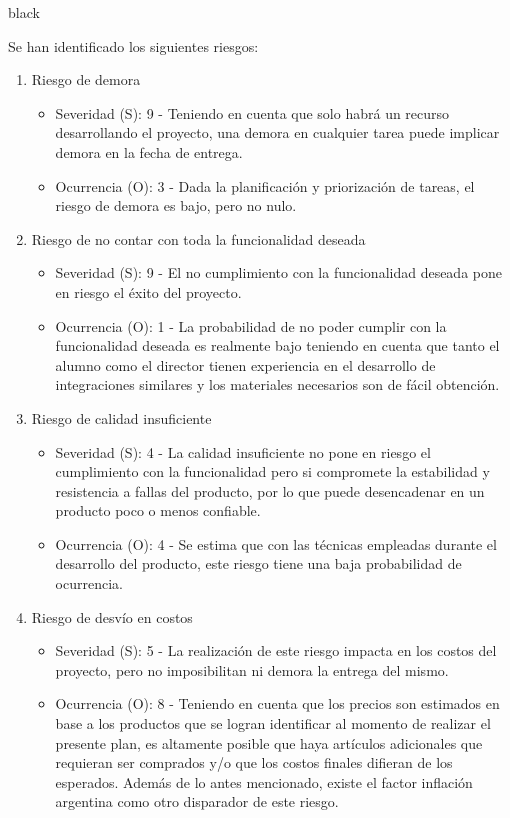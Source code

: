 \documentclass[
11pt, %
]{charter}
\begin{document}
\begin{consigna}{black}

Se han identificado los siguientes riesgos:


\begin{enumerate}

\item Riesgo de demora
\begin{itemize}
	\item Severidad (S): 9 - Teniendo en cuenta que solo habrá un recurso desarrollando el proyecto, una demora en cualquier tarea puede implicar demora en la fecha de entrega.
	\item Ocurrencia (O): 3 - Dada la planificación y priorización de tareas, el riesgo de demora es bajo, pero no nulo.
\end{itemize}


\item Riesgo de no contar con toda la funcionalidad deseada
\begin{itemize}
	\item Severidad (S): 9 - El no cumplimiento con la funcionalidad deseada pone en riesgo el éxito del proyecto.
	\item Ocurrencia (O): 1 - La probabilidad de no poder cumplir con la funcionalidad deseada es realmente bajo teniendo en cuenta que tanto el alumno como el director tienen experiencia en el desarrollo de integraciones similares y los materiales necesarios son de fácil obtención.
\end{itemize}

\item Riesgo de calidad insuficiente
\begin{itemize}
	\item Severidad (S): 4 - La calidad insuficiente no pone en riesgo el cumplimiento con la funcionalidad pero si compromete la estabilidad y resistencia a fallas del producto, por lo que puede desencadenar en un producto poco o menos confiable.
	\item Ocurrencia (O): 4 - Se estima que con las técnicas empleadas durante el desarrollo del producto, este riesgo tiene una baja probabilidad de ocurrencia.
\end{itemize}


\item Riesgo de desvío en costos
\begin{itemize}
	\item Severidad (S): 5 - La realización de este riesgo impacta en los costos del proyecto, pero no imposibilitan ni demora la entrega del mismo.
	\item Ocurrencia (O): 8 - Teniendo en cuenta que los precios son estimados en base a los productos que se logran identificar al momento de realizar el presente plan, es altamente posible que haya artículos adicionales que requieran ser comprados y/o que los costos finales difieran de los esperados. Además de lo antes mencionado, existe el factor inflación argentina como otro disparador de este riesgo.
\end{itemize}


\end{enumerate}
\end{consigna}
\end{document}
